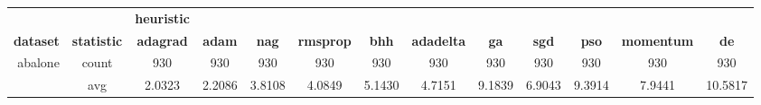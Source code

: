 \begin{table}[htbp]
{\begin{tabular}{rcccccccccccc}
			                                   &                                        & \multicolumn{1}{l}{\textbf{heuristic}}                                             &                                                                           &                                                                           &                                                                           &                                               &                                             &                                                &                                                &                                                &                                                &                                                \\
			\cmidrule{3-3}    \textbf{dataset} & \multicolumn{1}{l}{\textbf{statistic}} & \textbf{adagrad}                                                                   & \textbf{adam}                                                             & \textbf{nag}                                                              & \textbf{rmsprop}                                                          & \textbf{bhh}                                  & \textbf{adadelta}                           & \textbf{ga}                                    & \textbf{sgd}                                   & \textbf{pso}                                   & \textbf{momentum}                              & \textbf{de}                                    \\
			\midrule
			abalone                            & count                                  & 930                                                                                & 930                                                                       & 930                                                                       & 930                                                                       & 930                                           & 930                                         & 930                                            & 930                                            & 930                                            & 930                                            & 930                                            \\
			                                   & avg                                    & \cellcolor[rgb]{ .776,  .937,  .808}\textcolor[rgb]{ 0,  .38,  0}{2.0323}          & 2.2086                                                                    & 3.8108                                                                    & 4.0849                                                                    & 5.1430                                        & 4.7151                                      & 9.1839                                         & 6.9043                                         & 9.3914                                         & 7.9441                                         & 10.5817                                        \\

\end{tabular}}
\end{table}
